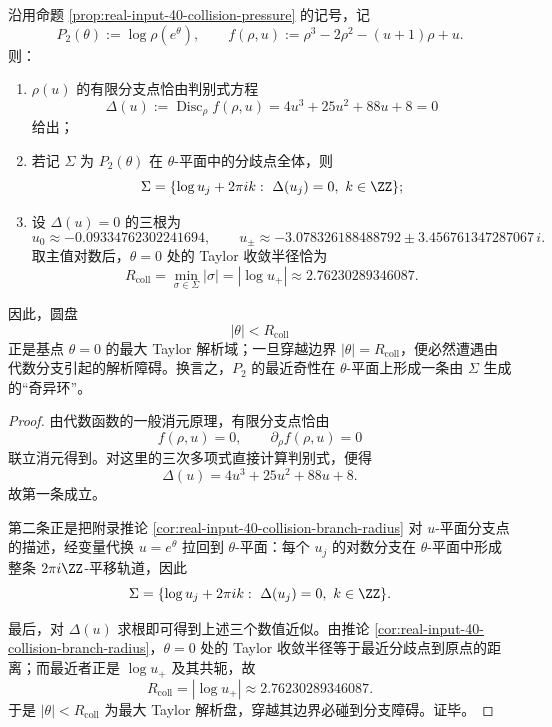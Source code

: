 \begin{theorem}\label{thm:derived-collision-pressure-singular-ring}
沿用命题 \ref{prop:real-input-40-collision-pressure} 的记号，记
\[
P_2(\theta):=\log \rho(e^\theta),
\qquad
f(\rho,u):=\rho^3-2\rho^2-(u+1)\rho+u.
\]
则：
\begin{enumerate}
  \item \(\rho(u)\) 的有限分支点恰由判别式方程
  \[
  \Delta(u):=\operatorname{Disc}_\rho f(\rho,u)=4u^3+25u^2+88u+8=0
  \]
  给出；
  \item 若记 \(\Sigma\) 为 \(P_2(\theta)\) 在 \(\theta\)-平面中的分歧点全体，则
  \[
  \Sigma=
  \{\log u_j+2\pi i k:\ \Delta(u_j)=0,\ k\in\ZZ\};
  \]
  \item 设 \(\Delta(u)=0\) 的三根为
  \[
  u_0\approx -0.09334762302241694,
  \qquad
  u_\pm\approx -3.078326188488792 \pm 3.456761347287067\,i.
  \]
  取主值对数后，\(\theta=0\) 处的 Taylor 收敛半径恰为
  \[
  R_{\mathrm{coll}}
  =
  \min_{\sigma\in\Sigma}|\sigma|
  =
  |\log u_+|
  \approx 2.76230289346087.
  \]
\end{enumerate}
因此，圆盘
\[
|\theta|<R_{\mathrm{coll}}
\]
正是基点 \(\theta=0\) 的最大 Taylor 解析域；一旦穿越边界 \(|\theta|=R_{\mathrm{coll}}\)，便必然遭遇由代数分支引起的解析障碍。换言之，\(P_2\) 的最近奇性在 \(\theta\)-平面上形成一条由 \(\Sigma\) 生成的“奇异环”。
\end{theorem}
\begin{proof}
由代数函数的一般消元原理，有限分支点恰由
\[
f(\rho,u)=0,
\qquad
\partial_\rho f(\rho,u)=0
\]
联立消元得到。对这里的三次多项式直接计算判别式，便得
\[
\Delta(u)=4u^3+25u^2+88u+8.
\]
故第一条成立。

第二条正是把附录推论 \ref{cor:real-input-40-collision-branch-radius} 对 \(u\)-平面分支点的描述，经变量代换 \(u=e^\theta\) 拉回到 \(\theta\)-平面：每个 \(u_j\) 的对数分支在 \(\theta\)-平面中形成整条 \(2\pi i\ZZ\)-平移轨道，因此
\[
\Sigma=
\{\log u_j+2\pi i k:\ \Delta(u_j)=0,\ k\in\ZZ\}.
\]

最后，对 \(\Delta(u)\) 求根即可得到上述三个数值近似。由推论 \ref{cor:real-input-40-collision-branch-radius}，\(\theta=0\) 处的 Taylor 收敛半径等于最近分歧点到原点的距离；而最近者正是 \(\log u_+\) 及其共轭，故
\[
R_{\mathrm{coll}}=|\log u_+|\approx 2.76230289346087.
\]
于是 \(|\theta|<R_{\mathrm{coll}}\) 为最大 Taylor 解析盘，穿越其边界必碰到分支障碍。证毕。
\end{proof}

